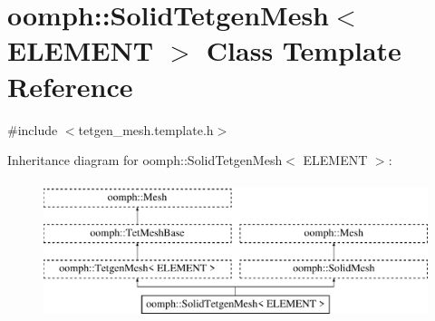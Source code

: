 \hypertarget{classoomph_1_1SolidTetgenMesh}{}\section{oomph\+:\+:Solid\+Tetgen\+Mesh$<$ E\+L\+E\+M\+E\+NT $>$ Class Template Reference}
\label{classoomph_1_1SolidTetgenMesh}


{\ttfamily \#include $<$tetgen\+\_\+mesh.\+template.\+h$>$}

Inheritance diagram for oomph\+:\+:Solid\+Tetgen\+Mesh$<$ E\+L\+E\+M\+E\+NT $>$\+:\begin{figure}[H]
\begin{center}
\leavevmode
\includegraphics[height=4.000000cm]{classoomph_1_1SolidTetgenMesh}
\end{center}
\end{figure}
